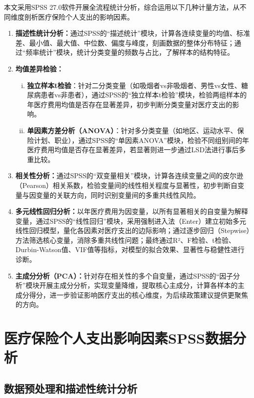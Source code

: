 \documentclass[a4paper]{ctexart}
\begin{document}
本文采用SPSS 27.0软件开展全流程统计分析，综合运用以下几种计量方法，从不同维度剖析医疗保险个人支出的影响因素。
\begin{enumerate}[(1)]
\item \textbf{描述性统计分析：}通过SPSS的“描述统计”模块，计算各连续变量的均值、标准差、最小值、最大值、中位数、偏度与峰度，刻画数据的整体分布特征；通过“频率统计”模块，统计分类变量的频数与占比，了解样本的结构特征。

\item \textbf{均值差异检验：}
\begin{enumerate}[(i)]
\item \textbf{独立样本t检验}：针对二分类变量（如吸烟者vs非吸烟者、男性vs女性、糖尿病患者vs非患者），通过SPSS的“独立样本t检验”模块，检验两组样本的年医疗费用均值是否存在显著差异，初步判断分类变量对医疗支出的影响。

\item \textbf{单因素方差分析（ANOVA）}：针对多分类变量（如地区、运动水平、保险计划、职业），通过SPSS的“单因素ANOVA”模块，检验不同组别间的年医疗费用均值是否存在显著差异，若显著则进一步通过LSD法进行事后多重比较。
\end{enumerate}

\item \textbf{相关性分析：}通过SPSS的“双变量相关”模块，计算各连续变量之间的皮尔逊（Pearson）相关系数，检验变量间的线性相关程度与显著性，初步判断自变量与因变量的关联方向，同时识别变量间的多重共线性风险。

\item \textbf{多元线性回归分析：}以年医疗费用为因变量，以所有显著相关的自变量为解释变量，通过SPSS的“线性回归”模块，采用强制进入法（Enter）建立初始多元线性回归模型，量化各因素对医疗支出的边际影响；通过逐步回归（Stepwise）方法筛选核心变量，消除多重共线性问题；最终通过R²、F检验、t检验、Durbin-Watson值、VIF值等指标，对模型的拟合效果、显著性与稳健性进行诊断。

\item \textbf{主成分分析（PCA）：}针对存在相关性的多个自变量，通过SPSS的“因子分析”模块开展主成分分析，实现变量降维，提取核心主成分，计算各样本的主成分得分，进一步验证影响医疗支出的核心维度，为后续政策建议提供更聚焦的方向。
\end{enumerate}


\section{医疗保险个人支出影响因素SPSS数据分析}

\subsection{数据预处理和描述性统计分析}
\end{document}
